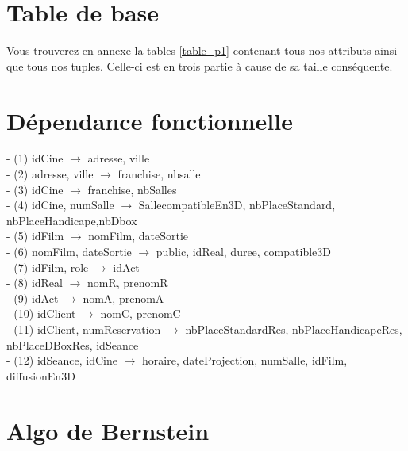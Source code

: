 \documentclass[a4paper,sffamily,12pt]{article}
\begin{document}
	\section{Table de base}	
		
		\vspace{0.5cm}
			
		Vous trouverez en annexe la tables \ref{table_p1} contenant tous nos attributs ainsi que tous nos tuples. Celle-ci est en trois partie à cause de sa taille conséquente.
		
		\vspace{0.5cm}						

	\section{Dépendance fonctionnelle}
	
		\vspace{0.5cm}
	
		\noindent- (1) idCine $\rightarrow$ adresse, ville \\
		- (2) adresse, ville $\rightarrow$ franchise, nbsalle \\
		- (3) idCine $\rightarrow$ franchise, nbSalles \\
		- (4) idCine, numSalle $\rightarrow$ SallecompatibleEn3D, nbPlaceStandard, nbPlaceHandicape,nbDbox \\
 		- (5) idFilm $\rightarrow$ nomFilm, dateSortie \\
		- (6) nomFilm, dateSortie $\rightarrow$ public, idReal, duree, compatible3D \\
		- (7) idFilm, role $\rightarrow$  idAct \\
		- (8) idReal $\rightarrow$ nomR, prenomR \\
		- (9) idAct $\rightarrow$ nomA, prenomA \\
		- (10) idClient $\rightarrow$ nomC, prenomC \\
		- (11) idClient, numReservation $\rightarrow$ nbPlaceStandardRes, nbPlaceHandicapeRes, nbPlaceDBoxRes, idSeance \\
		- (12) idSeance, idCine $\rightarrow$ horaire, dateProjection, numSalle, idFilm, diffusionEn3D \\
		
	\section{Algo de Bernstein}
	
		\vspace{0.5cm}
\end{document}
